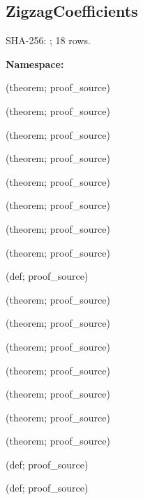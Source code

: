 \subsection*{ZigzagCoefficients}
{\footnotesize SHA-256: ; 18 rows.}\par
\begingroup\small
\textbf{Namespace:} \par
\noindent{} {\scriptsize (theorem; proof\_source)}\par
\noindent{} {\scriptsize (theorem; proof\_source)}\par
\noindent{} {\scriptsize (theorem; proof\_source)}\par
\noindent{} {\scriptsize (theorem; proof\_source)}\par
\noindent{} {\scriptsize (theorem; proof\_source)}\par
\noindent{} {\scriptsize (theorem; proof\_source)}\par
\noindent{} {\scriptsize (theorem; proof\_source)}\par
\noindent{} {\scriptsize (theorem; proof\_source)}\par
\noindent{} {\scriptsize (def; proof\_source)}\par
\noindent{} {\scriptsize (theorem; proof\_source)}\par
\noindent{} {\scriptsize (theorem; proof\_source)}\par
\noindent{} {\scriptsize (theorem; proof\_source)}\par
\noindent{} {\scriptsize (theorem; proof\_source)}\par
\noindent{} {\scriptsize (theorem; proof\_source)}\par
\noindent{} {\scriptsize (theorem; proof\_source)}\par
\noindent{} {\scriptsize (theorem; proof\_source)}\par
\noindent{} {\scriptsize (def; proof\_source)}\par
\noindent{} {\scriptsize (def; proof\_source)}\par
\endgroup
